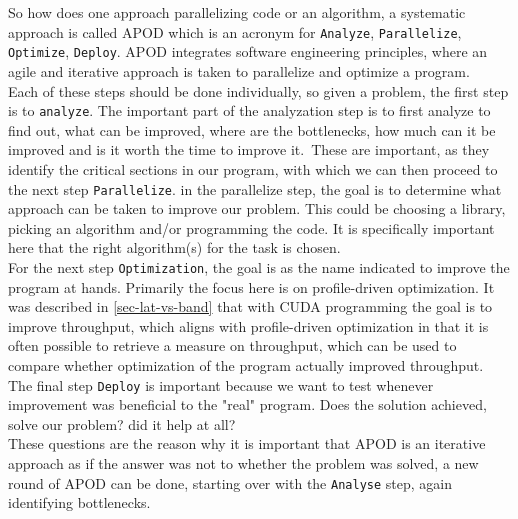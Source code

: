 So how does one approach parallelizing code or an algorithm, a systematic approach is called APOD which is an acronym for \texttt{Analyze}, \texttt{Parallelize}, \texttt{Optimize}, \texttt{Deploy}. APOD integrates software engineering principles, where an agile and iterative approach is taken to parallelize and optimize a program.\\
Each of these steps should be done individually, so given a problem, the first step is to \texttt{analyze}. The important part of the analyzation step is to first analyze to find out, what can be improved, where are the bottlenecks, how much can it be improved and is it worth the time to improve it.\
These are important, as they identify the critical sections in our program, with which we can then proceed to the next step \texttt{Parallelize}. in the parallelize step, the goal is to determine what approach can be taken to improve our problem. This could be choosing a library, picking an algorithm and/or programming the code. It is specifically important here that the right algorithm(s) for the task is chosen.\\
For the next step \texttt{Optimization}, the goal is as the name indicated to improve the program at hands. Primarily the focus here is on profile-driven optimization. It was described in \cref{sec-lat-vs-band} that with CUDA programming the goal is to improve throughput, which aligns with profile-driven optimization in that it is often possible to retrieve a measure on throughput, which can be used to compare whether optimization of the program actually improved throughput.\\
The final step \texttt{Deploy} is important because we want to test whenever improvement was beneficial to the "real" program. Does the solution achieved, solve our problem? did it help at all?\\ These questions are the reason why it is important that APOD is an iterative approach as if the answer was not to whether the problem was solved, a new round of APOD can be done, starting over with the \texttt{Analyse} step, again identifying bottlenecks. 